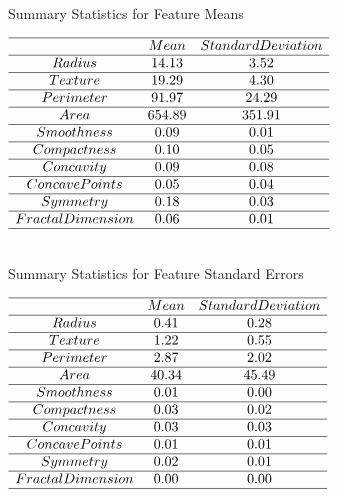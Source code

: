 \documentclass[conference]{IEEEtran}
\begin{document}
\begin{table}[ht]
    \centering
    \caption{\\Summary Statistics for Feature Means}
    $\begin{array}{ccc}
         \hline
         & Mean & Standard Deviation\\
         \hline
         Radius & 14.13 & 3.52\\
         \hline
         Texture & 19.29 & 4.30\\
         \hline
         Perimeter & 91.97 & 24.29\\
         \hline
         Area & 654.89 & 351.91\\
         \hline
         Smoothness & 0.09 & 0.01\\
         \hline
         Compactness & 0.10 & 0.05\\
         \hline
         Concavity & 0.09 & 0.08\\
         \hline
         Concave Points & 0.05 & 0.04\\
         \hline
         Symmetry & 0.18 & 0.03\\
         \hline
         Fractal Dimension & 0.06 & 0.01\\
         \hline
    \end{array}$
    
    \caption{\\Summary Statistics for Feature Standard Errors}
    $\begin{array}{ccc}
         \hline
         & Mean & Standard Deviation\\
         \hline
         Radius & 0.41 & 0.28\\
         \hline
         Texture & 1.22 & 0.55\\
         \hline
         Perimeter & 2.87 & 2.02\\
         \hline
         Area & 40.34 & 45.49\\
         \hline
         Smoothness & 0.01 & 0.00\\
         \hline
         Compactness & 0.03 & 0.02\\
         \hline
         Concavity & 0.03 & 0.03\\
         \hline
         Concave Points & 0.01 & 0.01\\
         \hline
         Symmetry & 0.02 & 0.01\\
         \hline
         Fractal Dimension & 0.00 & 0.00\\
         \hline
    \end{array}$
    

\end{table}
\end{document}
